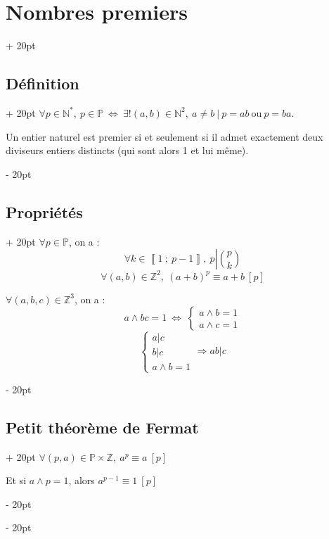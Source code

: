 \documentclass[a4paper, 12pt, twoside]{article}
\newcommand{\N}{\mathbb{N}} %
\newcommand{\Z}{\mathbb{Z}} %
\newcommand{\nset}[2]{\left\llbracket #1\ ;\ #2 \right\rrbracket}
\newcommand{\ssi}{\ \Leftrightarrow \ }
\newcommand{\eqsys}[2]{\begin{cases} #1 \\ #2 \end{cases}}
\newcommand{\ind}[1][20pt]{\advance\leftskip + #1}
\newcommand{\deind}[1][20pt]{\advance\leftskip - #1}
\newenvironment{indt}[2][20pt]{#2 \par \ind[#1]}{\par \deind} %
\begin{document}
    \begin{indt}{\section{Nombres premiers}}
        
        \begin{indt}{\subsection{Définition}}
            $\forall p \in \N^*,\ p \in \mathbb{P} \ssi \exists! (a, b) \in \N^2,\ a \neq b\ |\ p = ab\ \text{ou}\ p = ba$.
            
            Un entier naturel est premier si et seulement si il admet exactement deux diviseurs entiers distincts (qui sont alors 1 et lui même).
        \end{indt}
        
        \vspace{6pt}
        
        \begin{indt}{\subsection{Propriétés}}
            $\forall p \in \mathbb P$, on a :
                \[ \forall k \in \nset{1}{p - 1},\ p \left| \binom{p}{k} \right. \]
                \[ \forall (a, b) \in \Z^2,\ (a + b)^p \equiv a + b\ [p] \]
            
            \vspace{6pt}
            
            $\forall (a, b, c) \in \Z^3$, on a :
                \[ a \wedge bc = 1 \ssi \eqsys{a \wedge b = 1}{a \wedge c = 1} \]
                \[
                    \begin{cases}
                        a|c
                        \\
                        b|c
                        \\
                        a \wedge b = 1
                    \end{cases}
                    \Rightarrow ab|c
                \]
        \end{indt}
        
        \vspace{6pt}
        
        \begin{indt}{\subsection{Petit théorème de Fermat}}
            $\forall (p, a) \in \mathbb P \times \Z,\ a^p \equiv a\ [p]$
            
            Et si $a \wedge p = 1$, alors $a^{p - 1} \equiv 1\ [p]$
        \end{indt}
        
    \end{indt}




    

    
    
\end{document}
